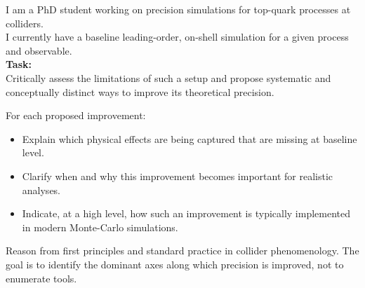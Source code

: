 \documentclass[submission, Phys]{SciPost}
\begin{document}
\begin{userblock}[User]
I am a PhD student working on precision simulations for top-quark processes at colliders.\\
I currently have a baseline leading-order, on-shell simulation for a given process and observable.\\

\textbf{Task:}\\ 
Critically assess the limitations of such a setup and propose systematic and conceptually distinct ways to improve its theoretical precision.

For each proposed improvement:
\begin{itemize}
    \item Explain which physical effects are being captured that are missing at baseline level.
    \item Clarify when and why this improvement becomes important for realistic analyses.
    \item Indicate, at a high level, how such an improvement is typically implemented in modern Monte-Carlo simulations.
\end{itemize}

Reason from first principles and standard practice in collider phenomenology. The goal is to identify the dominant axes along which precision is improved, not to enumerate tools.
\end{userblock}
%
\end{document}

